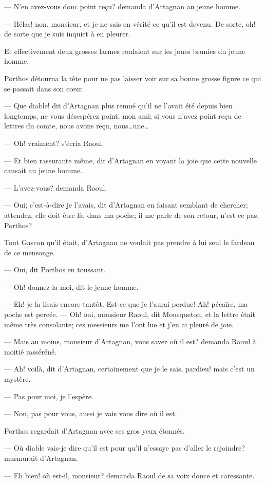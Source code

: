 — N'en avez-vous donc point reçu? demanda d'Artagnan au jeune homme.

— Hélas! non, monsieur, et je ne sais en vérité ce qu'il est devenu. De sorte, oh! de sorte que je suis inquiet à en pleurer.

Et effectivement deux grosses larmes roulaient sur les joues brunies du jeune homme.

Porthos détourna la tête pour ne pas laisser voir sur sa bonne grosse figure ce qui se passait dans son cœur.

— Que diable! dit d'Artagnan plus remué qu'il ne l'avait été depuis bien longtemps, ne vous désespérez point, mon ami; si vous n'avez point reçu de lettres du comte, nous avons reçu, nous\dots une\dots

— Oh! vraiment? s'écria Raoul.

— Et bien rassurante même, dit d'Artagnan en voyant la joie que cette nouvelle causait au jeune homme.

— L'avez-vous? demanda Raoul.

— Oui; c'est-à-dire je l'avais, dit d'Artagnan en faisant semblant de chercher; attendez, elle doit être là, dans ma poche; il me parle de son retour, n'est-ce pas, Porthos?

Tout Gascon qu'il était, d'Artagnan ne voulait pas prendre à lui seul le fardeau de ce mensonge.

— Oui, dit Porthos en toussant.

— Oh! donnez-la-moi, dit le jeune homme.

— Eh! je la lisais encore tantôt. Est-ce que je l'aurai perdue! Ah! pécaïre, ma poche est percée.
— Oh! oui, monsieur Raoul, dit Mousqueton, et la lettre était même très consolante; ces messieurs me l'ont lue et j'en ai pleuré de joie.

— Mais au moins, monsieur d'Artagnan, vous savez où il est? demanda Raoul à moitié rasséréné.

— Ah! voilà, dit d'Artagnan, certainement que je le sais, pardieu! mais c'est un mystère.

— Pas pour moi, je l'espère.

— Non, pas pour vous, aussi je vais vous dire où il est.

Porthos regardait d'Artagnan avec ses gros yeux étonnés.

— Où diable vais-je dire qu'il est pour qu'il n'essaye pas d'aller le rejoindre? murmurait d'Artagnan.

— Eh bien! où est-il, monsieur? demanda Raoul de sa voix douce et caressante.

